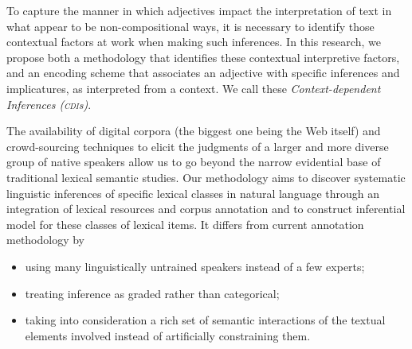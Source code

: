 \documentclass[10pt]{article}
\newcommand{\moveup}{\vspace*{-1.8mm}}
\begin{document}
To capture the manner in which adjectives impact the interpretation of text in what appear to be  non-compositional ways, 
it is necessary to identify those contextual factors at work when making such inferences. In this research, we propose both a methodology that identifies these contextual interpretive factors, and an encoding scheme that associates an adjective with specific inferences and implicatures, as interpreted from a context. We call these {\it Context-dependent Inferences (\textsc{cdi}s)}. 

The availability of digital corpora (the biggest one being the Web itself) and crowd-sourcing techniques to elicit the judgments of a larger and more diverse group of native speakers allow us to go beyond the narrow evidential base of traditional lexical semantic studies. Our methodology aims to discover systematic linguistic inferences of specific lexical classes in natural language through an integration of lexical resources and corpus annotation and to construct  inferential model for these classes of lexical items. It differs from current annotation methodology by
\begin{itemize}
\moveup
\item using many linguistically untrained speakers instead of a few experts;
\moveup
\item treating inference as graded rather than categorical;
\moveup
\item taking into consideration a rich set of semantic interactions of the textual elements involved instead of artificially constraining them.
\moveup
\end{itemize}


\end{document}
